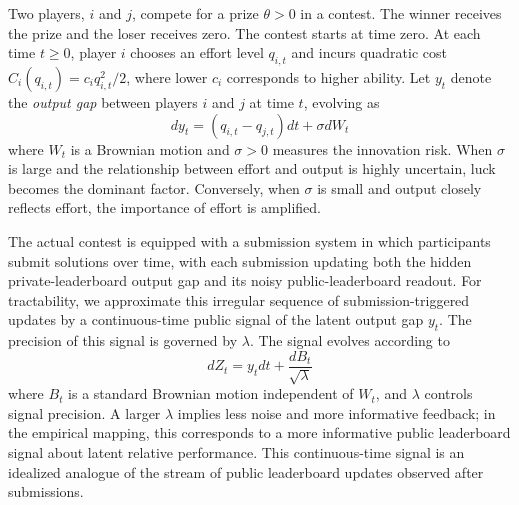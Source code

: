 \documentclass[mnsc]{informs3}
\begin{document}
Two players, $i$ and $j$, compete for a prize $\theta>0$ in a contest.
The winner receives the prize and the loser receives zero.
The contest starts at time zero.
At each time $t\ge0$, player $i$ chooses an effort level $q_{i,t}$ and incurs quadratic cost $C_i(q_{i,t}) = c_i q_{i,t}^2/2$, where lower $c_i$ corresponds to higher ability.
Let $y_t$ denote the \textit{output gap} between players $i$ and $j$ at time $t$, evolving as
\begin{equation}\label{eq-state-dynamics}
	dy_t = (q_{i,t}-q_{j,t})dt + \sigma dW_t
\end{equation}
where $W_t$ is a Brownian motion and $\sigma>0$ measures the innovation risk.
When $\sigma$ is large and the relationship between effort and output is highly uncertain, luck becomes the dominant factor.
Conversely, when $\sigma$ is small and output closely reflects effort, the importance of effort is amplified.

The actual contest is equipped with a submission system in which participants submit solutions over time, with each submission updating both the hidden private-leaderboard output gap and its noisy public-leaderboard readout.
For tractability, we approximate this irregular sequence of submission-triggered updates by a continuous-time public signal of the latent output gap $y_t$.
The precision of this signal is governed by $\lambda$.
The signal evolves according to
\begin{equation}\label{signal}
	dZ_{t} = y_{t}dt + \frac{dB_{t}}{\sqrt{\lambda}}
\end{equation}
where $B_{t}$ is a standard Brownian motion independent of $W_t$, and $\lambda$ controls signal precision.
A larger $\lambda$ implies less noise and more informative feedback; in the empirical mapping, this corresponds to a more informative public leaderboard signal about latent relative performance.
This continuous-time signal is an idealized analogue of the stream of public leaderboard updates observed after submissions.
\end{document}
